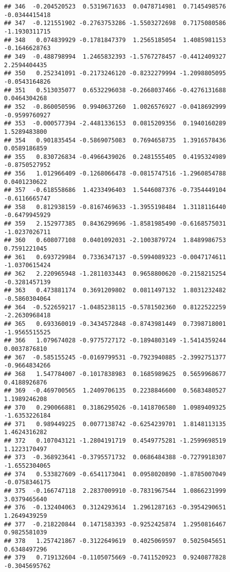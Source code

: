 \documentclass[
]{article}
\begin{document}
\begin{verbatim}
## 346  -0.204520523  0.5319671633  0.0478714981  0.7145498576 -0.0344415418
## 347  -0.121551902 -0.2763753286 -1.5503272698  0.7175080586 -1.1930311715
## 348   0.074839929 -0.1781847379  1.2565185054  1.4085981153 -0.1646628763
## 349  -0.488798994  1.2465832393 -1.5767278457 -0.4412409327  2.2594404435
## 350   0.252341091 -0.2173246120 -0.8232279994 -1.2098805095 -0.0543164826
## 351   0.513035077  0.6532296038 -0.2668037466 -0.4276131688  0.0464304268
## 352  -0.860050596  0.9940637260  1.0026576927 -0.0418692999 -0.9599760927
## 353  -0.000577394 -2.4481336153  0.0815209356  0.1940160289  1.5289483800
## 354   0.901835454 -0.5869075083  0.7694658735  1.3916578436  0.0589186859
## 355   0.830726834 -0.4966439026  0.2481555405  0.4195324989 -0.8750527952
## 356   1.012966409 -0.1268066478 -0.0815747516 -1.2960854788  0.0401230622
## 357  -0.618558686  1.4233496403  1.5446087376 -0.7354449104 -0.6116665747
## 358   0.812938159 -0.8167469633 -1.3955198484  1.3118116440 -0.6479945929
## 359   2.152977385  0.8436299696 -1.8581985490 -0.6168575031 -1.0237026711
## 360   0.608077108  0.0401092031 -2.1003879724  1.8489986753  0.7591221045
## 361   0.693729984  0.7336347137 -0.5994089323 -0.0047174611 -1.0370615424
## 362   2.220965948 -1.2811033443  0.9658800620 -0.2158215254 -0.3281457139
## 363   0.473881174  0.3691209802  0.0811497132  1.8031232482 -0.5860304064
## 364  -0.522659217 -1.0485238115 -0.5781502360  0.8122522259 -2.2630968418
## 365   0.693360019 -0.3434572848 -0.8743981449  0.7398718001 -1.9565515525
## 366   1.079674028 -0.9775727172 -0.1894803149 -1.5414359244  0.0037876810
## 367  -0.585155245 -0.0169799531 -0.7923940885 -2.3992751377 -0.9664834266
## 368   1.547784007 -0.1017838983  0.1685989625  0.5659968677  0.4188926876
## 369  -0.469700565  1.2409706135  0.2238846600  0.5683480527  1.1989246208
## 370   0.290066881  0.3186295026 -0.1418706580  1.0989409325 -1.6353226184
## 371   0.989449225  0.0077138742 -0.6254239701  1.8148113135  1.4624316282
## 372   0.107043121 -1.2804191719  0.4549775281 -1.2599698519  1.1223170497
## 373  -0.368923641 -0.3795571732  0.0686484388 -0.7279918307 -1.6552304065
## 374   0.533827609 -0.6541173041  0.0958020890 -1.8785007049 -0.0758346175
## 375  -0.166747118  2.2837009910 -0.7831967544  1.0866231999  3.0379465640
## 376  -0.132404063  0.3124293614  1.2961287163 -0.3954290651  1.2649439259
## 377  -0.218220844  0.1471583393 -0.9252425874  1.2950816467  0.9825581039
## 378   1.257421867 -0.3122649619  0.4025069597  0.5025045651  0.6348497296
## 379   0.719132604 -0.1105075669 -0.7411520923  0.9240877828 -0.3045695762

\end{verbatim}
\end{document}
